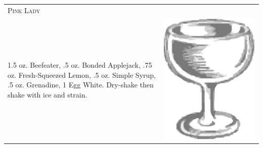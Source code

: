 \documentclass{article}
\begin{document}
\begin{tabular}{p{2in} p{0.5in}}
\multicolumn{2}{p{3in}}{\centering\Huge\textsc{Pink Lady}} \\ 
   \vspace{-0.1in}1.5 oz. Beefeater, .5 oz. Bonded Applejack, .75 oz. Fresh-Squeezed Lemon, .5 oz. Simple Syrup, .5 oz. Grenadine, 1 Egg White. Dry-shake then shake with ice and strain. &
   \vspace{-0.1in} \includegraphics{coupe.png}
\end{tabular}
\end{document}
